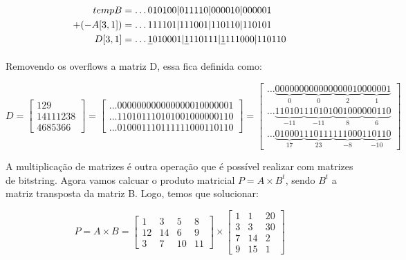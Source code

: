 \documentclass[12pt]{article}
\begin{document}
\begin{align*}
tempB	  &= \ldots010100|011110|000010|000001 \\
+(-A[3,1])&= \ldots111101|111001|110110|110101\\ 
D[3,1]	  &= \ldots\sout{1}010001|\sout{1}110111|\sout{1}111000|110110
\end{align*}

Removendo os overflows a matriz D, essa fica definida como:

\begin{equation}
	D = \begin{bmatrix}
			129\\ 
			14111238\\ 
			4685366
		\end{bmatrix} 
        =
        \begin{bmatrix}
   			\ldots000000000000000010000001 \\
			\ldots110101110101001000000110 \\
			\ldots010001110111111000110110
		\end{bmatrix}
        =
        \begin{bmatrix}
 \ldots\underbrace{000000}_{0}\underbrace{000000}_{0}\underbrace{000010}_{2}
\underbrace{000001}_{1} \\ 			 
 \ldots\underbrace{110101}_{-11}\underbrace{110101}_{-11}\underbrace{001000}_{8}
\underbrace{000110}_{6} \\
 \ldots\underbrace{010001}_{17}\underbrace{110111}_{23}\underbrace{111000}_{-8}
\underbrace{110110}_{-10}
		\end{bmatrix}
\end{equation}

A multiplicação de matrizes é outra operação que é possível realizar com
matrizes de bitstring. Agora vamos calcuar o produto matricial $P = A \times
B^{t}$, sendo $B^t$ a matriz transposta da matriz B. Logo, temos que solucionar:

\begin{equation}
	P = A \times B = \begin{bmatrix}
			1 & 3 & 5 & 8\\ 
			12 &14  & 6 & 9\\ 
			3 & 7 & 10 & 11
		\end{bmatrix}
        \times
		\begin{bmatrix}
			1 & 1  & 20\\ 
            3 & 3  & 30\\
            7 & 14 & 2\\
            9 & 15 & 1
		\end{bmatrix}
\end{equation}
\end{document}
